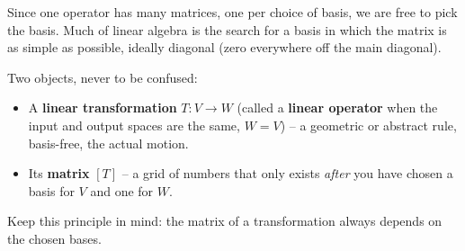 \begin{intuitionbox}
Since one operator has many matrices, one per choice of basis, we are free to
pick the basis. Much of linear algebra is the search for a basis in which the
matrix is as simple as possible, ideally diagonal (zero everywhere off the main
diagonal).
\end{intuitionbox}

\begin{focusbox}
Two objects, never to be confused:
\begin{itemize}
  \item A \textbf{linear transformation} $T:V\to W$ (called a \textbf{linear
        operator} when the input and output spaces are the same, $W=V$) -- a
        geometric or abstract rule, basis-free, the actual motion.
  \item Its \textbf{matrix} $[T]$ -- a grid of numbers that only exists \emph{after}
        you have chosen a basis for $V$ and one for $W$.
\end{itemize}
Keep this principle in mind: the matrix of a transformation always depends on
the chosen bases.
\end{focusbox}

